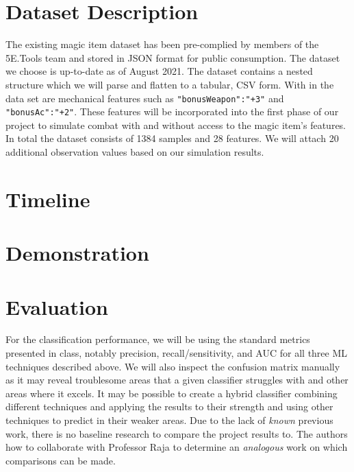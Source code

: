 \documentclass[12pt]{diazessay}
\begin{document}
\section*{Dataset Description}

The existing magic item dataset \cite{Mirror5eTools} has been pre-complied by members of the 5E.Tools team and stored in JSON format for public consumption.
The dataset we choose is up-to-date as of August 2021.
The dataset contains a nested structure which we will parse and flatten to a tabular, CSV form.
With in the data set are mechanical features such as \texttt{"bonusWeapon":"+3"} and \texttt{"bonusAc":"+2"}.
These features will be incorporated into the first phase of our project to simulate combat with and without access to the magic item's features.
In total the dataset consists of 1384 samples and 28 features.
We will attach 20 additional observation values based on our simulation results.

\section*{Timeline}

\section*{Demonstration}

\section*{Evaluation}

For the classification performance, we will be using the standard metrics presented in class, notably precision, recall/sensitivity, and AUC for all three ML techniques described above.
We will also inspect the confusion matrix manually as it may reveal troublesome areas that a given classifier struggles with and other areas where it excels.
It may be possible to create a hybrid classifier combining different techniques and applying the results to their strength and using other techniques to predict in their weaker areas.
Due to the lack of \emph{known} previous work, there is no baseline research to compare the project results to.
The authors how to collaborate with Professor Raja to determine an \emph{analogous} work on which comparisons can be made.

\clearpage



\end{document}
